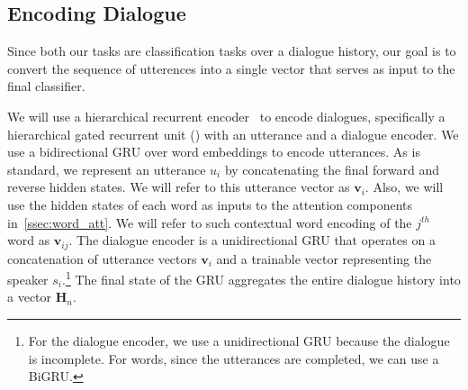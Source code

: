\subsection{Encoding Dialogue}
\label{ssec:dialog_rep}




Since both our tasks are classification tasks over a dialogue
history, our goal is to convert the sequence of utterences into a
single vector that serves as input to the final classifier.

We will use a hierarchical recurrent encoder~\cite[and
others]{li2015hierarchical,sordoni2015hierarchical,serban2016building}
to encode dialogues, specifically a hierarchical gated recurrent
unit (\HGRU) with an utterance and a dialogue encoder. We use a
bidirectional GRU over word embeddings to encode utterances. As is
standard, we represent an utterance $u_i$ by concatenating the final
forward and reverse hidden states. We will refer to this utterance
vector as $\bm{v}_i$. Also, we will use the hidden states of
each word as inputs to the attention components in~\autoref{ssec:word_att}. We will refer to such contextual word
encoding of the $j^{th}$ word as $\bm{v}_{ij}$. The dialogue encoder
is a unidirectional GRU that operates on a concatenation of
utterance vectors $\bm{v}_i$ and a trainable vector representing the
speaker $s_i$.\footnote{For the dialogue encoder, we use a
  unidirectional GRU because the dialogue is incomplete. For words,
  since the utterances are completed, we can use a BiGRU.} The final
state of the GRU aggregates the entire dialogue history into a
vector $\bm{H}_n$.



